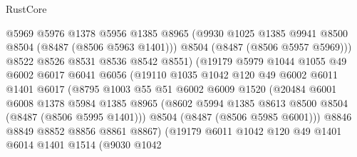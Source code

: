 \begin{lexlean}{RustCore}
\begin{coremodule}
                              @5969
                              @5976
                              @1378
                              @5956
                              @1385
                              @8965
                              (@9930 @1025 @1385 @9941 @8500 @8504 (@8487 (@8506 @5963 @1401)))
                              @8504
                              (@8487 (@8506 @5957 @5969)))
                            @8522
                            @8526
                            @8531
                            @8536
                            @8542
                            @8551)
                          (@19179
                            @5979
                            @1044
                            @1055
                            @49
                            @6002
                            @6017
                            @6041
                            @6056
                            (@19110
                              @1035
                              @1042
                              @120
                              @49
                              @6002
                              @6011
                              @1401
                              @6017
                              (@8795
                                @1003
                                @55
                                @51
                                @6002
                                @6009
                                @1520
                                (@20484
                                  @6001
                                  @6008
                                  @1378
                                  @5984
                                  @1385
                                  @8965
                                  (@8602 @5994 @1385 @8613 @8500 @8504 (@8487 (@8506 @5995 @1401)))
                                  @8504
                                  (@8487 (@8506 @5985 @6001)))
                                @8846
                                @8849
                                @8852
                                @8856
                                @8861
                                @8867)
                              (@19179
                                @6011
                                @1042
                                @120
                                @49
                                @1401
                                @6014
                                @1401
                                @1514
                                (@9030
                                  @1042

\end{coremodule}
\end{lexlean}
